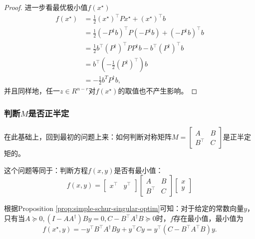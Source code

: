 \begin{subappendices}
\begin{proof}
进一步看最优极小值$f(x^{\star})$
\begin{equation}
  \label{eq:simple-schulr-optimum-y-value}
\begin{split}
    f(x^{\star}) &= \frac{1}{2} (x^{\star})^{\top} P x^{\star} + (x^{\star})^{\top} b \\
    &= \frac{1}{2} \left(-P^{\dagger} b\right)^{\top} P \left(-P^{\dagger} b\right) + \left(-P^{\dagger} b\right)^{\top} b \\
    &= \frac{1}{2}  b^{\top} (P^{\dagger})^{\top} P P^{\dagger} b - b^{\top} (P^{\dagger})^{\top} b \\
    &= b^{\top} \left(-\frac{1}{2} (P^{\dagger})^{\top} \right) b \\
    &= -\frac{1}{2} b^{T} P^{\dagger} b,
\end{split}
\end{equation}
并且同样地，任一$z \in R^{n-r}$对$f(x^{\star})$的取值也不产生影响。
\end{proof}

\subsubsection{判断$M$是否正半定}
在此基础上，回到最初的问题上来：如何判断对称矩阵$M = \begin{bmatrix} A & B \\ B^{\top} &C\end{bmatrix}$是正半定矩的。

这个问题等同于：判断方程$f(x,y)$是否有最小值：
\begin{equation*}
  f(x,y) = \begin{bmatrix} x^{\top} & y^{\top} \end{bmatrix}  \begin{bmatrix} A & B \\ B^{\top} & C\end{bmatrix} \begin{bmatrix} x \\ y \end{bmatrix}
\end{equation*}

根据Proposition \eqref{prop:simple-schur-singular-optim}可知：对于给定的常数向量$y$，只有当$A \succeq 0, \left( I - A A^{\dagger} \right) B y=0, C-B^{\top} A^{\dagger} B \succeq 0$时，$f$存在最小值，最小值为
\begin{equation*}
  f(x^{\star}, y ) = - y^{\top} B^{\top} A^{\dagger} B y + y^{\top} C y = y^{\top} \left( C - B^{\top} A^{\top} B\right)y.
\end{equation*}


\end{subappendices}
